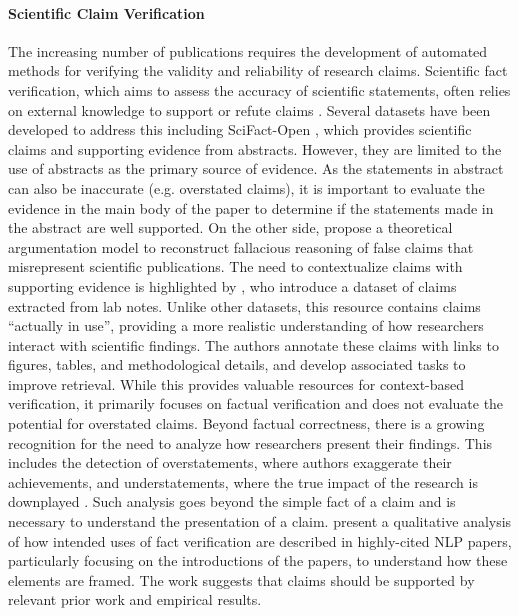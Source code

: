 \paragraph{Scientific Claim Verification} 

The increasing number of publications requires the development of automated methods for verifying the validity and reliability of research claims. Scientific fact verification, which aims to assess the accuracy of scientific statements, often relies on external knowledge to support or refute claims \citep{vladika2023scientific, dmonte2024claim}. Several datasets have been developed to address this including SciFact-Open \citep{wadden2022scifact}, which provides scientific claims and supporting evidence from abstracts. However, they are limited to the use of abstracts as the primary source of evidence. As the statements in abstract can also be inaccurate (e.g. overstated claims), it is important to evaluate the evidence in the main body of the paper to determine if the statements made in the abstract are well supported. On the other side, \citet{glockner-etal-2024-missci,glockner2024groundingfallaciesmisrepresentingscientific} %
propose a theoretical argumentation model to reconstruct fallacious reasoning of false claims that misrepresent scientific publications.
% 
The need to contextualize claims with supporting evidence is highlighted by \citet{chan2024overview}, who introduce a dataset of claims extracted from lab notes. Unlike other datasets, this resource contains claims ``actually in use'', providing a more realistic understanding of how researchers interact with scientific findings. The authors annotate these claims with links to figures, tables, and methodological details, and develop associated tasks to improve retrieval. While this provides valuable resources for context-based verification, it primarily focuses on factual verification and does not evaluate the potential for overstated claims.
% 
Beyond factual correctness, there is a growing recognition for the need to analyze how researchers present their findings. This includes the detection of overstatements, where authors exaggerate their achievements, and understatements, where the true impact of the research is downplayed \citep{kao2024we}. Such analysis goes beyond the simple fact of a claim and is necessary to understand the presentation of a claim. \citet{schlichtkrull2023intended} present a qualitative analysis of how intended uses of fact verification are described in highly-cited NLP papers, particularly focusing on the introductions of the papers, to understand how these elements are framed. The work suggests that claims should be supported by relevant prior work and empirical results.

